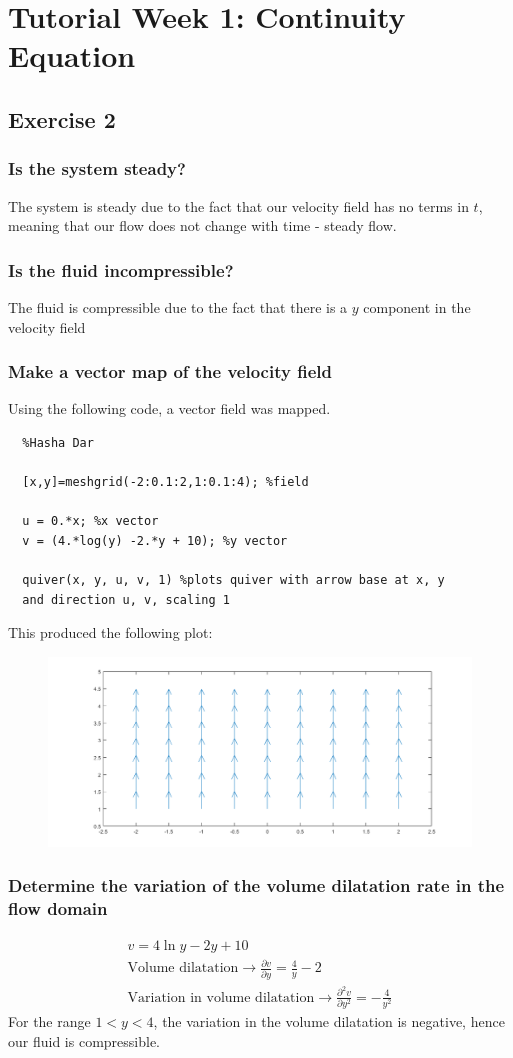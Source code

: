\documentclass[class=report, crop=false, 12pt,a4paper]{standalone}
\begin{document}
\section{Tutorial Week 1: Continuity Equation}
\subsection{Exercise 2}
\subsubsection{Is the system steady?}
The system is steady due to the fact that our velocity field has no terms in $t$, meaning that our flow does not change with time - steady flow.
\subsubsection{Is the fluid incompressible?}
The fluid is compressible due to the fact that there is a $y$ component in the velocity field
\subsubsection{Make a vector map of the velocity field}
Using the following code, a vector field was mapped.
\begin{verbatim}
  %Hasha Dar

  [x,y]=meshgrid(-2:0.1:2,1:0.1:4); %field

  u = 0.*x; %x vector
  v = (4.*log(y) -2.*y + 10); %y vector

  quiver(x, y, u, v, 1) %plots quiver with arrow base at x, y 
  and direction u, v, scaling 1
\end{verbatim}
This produced the following plot:
\begin{figure}[H]
  \centering
  \includegraphics[width = \textwidth]{../img/quiverplotexercise20011-002.png}
\end{figure}
\subsubsection{Determine the variation of the volume dilatation rate in the flow domain}
\begin{gather}
  v = 4\ln{y} - 2y + 10\\
  \textrm{Volume dilatation} \rightarrow \frac{\partial v}{\partial y} = \frac{4}{y} - 2\\
  \textrm{Variation in volume dilatation} \rightarrow \frac{\partial ^2 v}{\partial y^2} = -\frac{4}{y^2}
\end{gather}
For the range $1 < y < 4$, the variation in the volume dilatation is negative, hence our fluid is compressible. 
\end{document}
